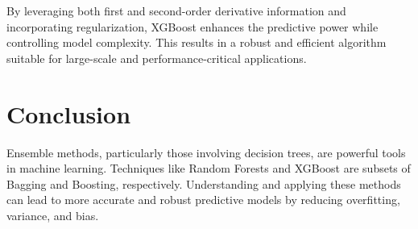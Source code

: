 \documentclass[12pt]{article}
\begin{document}
By leveraging both first and second-order derivative information and incorporating regularization, XGBoost enhances the predictive power while controlling model complexity. This results in a robust and efficient algorithm suitable for large-scale and performance-critical applications.


\section{Conclusion}
Ensemble methods, particularly those involving decision trees, are powerful tools in machine learning. Techniques like Random Forests and XGBoost are subsets of Bagging and Boosting, respectively. Understanding and applying these methods can lead to more accurate and robust predictive models by reducing overfitting, variance, and bias.
\end{document}
